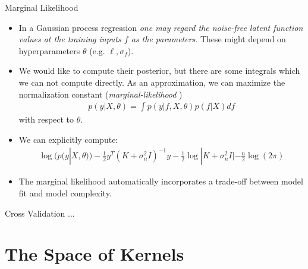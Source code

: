 \documentclass[10pt]{beamer}
\begin{document}
\begin{frame}{Marginal Likelihood}{\cite[Chapter 5.4.1]{RW05}}
\begin{itemize}
\item In a Gaussian process regression {\em one may regard the noise-free latent function values at the training inputs $f$ as the parameters}. These might depend on hyperparameters $\theta$ (e.g. $\ell, \sigma_f$).
\item We would like to compute their posterior, but there are some integrals which we can not compute directly. As an approximation, we can maximize the normalization constant ({\em marginal-likelihood} ) 
\begin{align*}
p(y|X, \theta) = \int p(y|f, X, \theta)p(f|X) df 
\end{align*}
with respect to $\theta$.
\pause
\item We can explicitly compute:
\begin{align*}
\log(p(y|X, \theta))-\frac{1}{2}y^T (K+\sigma_n^2I)^{-1}y - \frac{1}{2}\log|K+\sigma_n^2I| - \frac{n}{2}\log (2\pi)
\end{align*}
\item The marginal likelihood automatically incorporates a trade-off between model fit and model complexity.
\end{itemize}
\end{frame}

\begin{frame}{Cross Validation}
...
\end{frame}


\section{The Space of Kernels}
\end{document}
